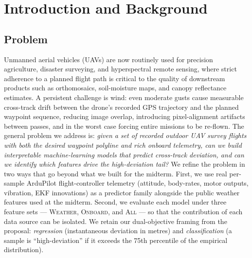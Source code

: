 \documentclass[sigconf, nonacm]{acmart}
\begin{document}
\section{Introduction and Background}

\subsection{Problem}
Unmanned aerial vehicles (UAVs) are now routinely used for precision
agriculture, disaster surveying, and hyperspectral remote sensing, where
strict adherence to a planned flight path is critical to the quality of
downstream products such as orthomosaics, soil-moisture maps, and canopy
reflectance estimates.  A persistent challenge is wind: even moderate gusts
cause measurable cross-track drift between the drone's recorded GPS
trajectory and the planned waypoint sequence, reducing image overlap,
introducing pixel-alignment artifacts between passes, and in the worst case
forcing entire missions to be re-flown.  The general problem we address is:
\emph{given a set of recorded outdoor UAV survey flights with both the
desired waypoint polyline and rich onboard telemetry, can we build
interpretable machine-learning models that predict cross-track deviation,
and can we identify which features drive the high-deviation tail?}  We
refine the problem in two ways that go beyond what we built for the midterm.
First, we use real per-sample ArduPilot flight-controller telemetry
(attitude, body-rates, motor outputs, vibration, EKF innovations) as a
predictor family alongside the public weather features used at the midterm.
Second, we evaluate each model under three feature sets ---
\textsc{Weather}, \textsc{Onboard}, and \textsc{All} --- so that the
contribution of each data source can be isolated.  We retain our
dual-objective framing from the proposal: \emph{regression} (instantaneous
deviation in metres) and \emph{classification} (a sample is ``high-deviation''
if it exceeds the 75th percentile of the empirical distribution).
\end{document}
